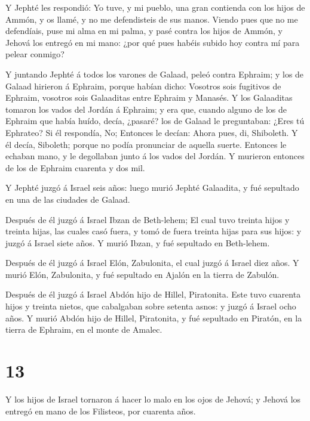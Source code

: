  Y Jephté les respondió: Yo tuve, y mi pueblo, una gran
contienda con los hijos de Ammón, y os llamé, y no me defendisteis de
sus manos.  Viendo pues que no me defendíais, puse mi alma
en mi palma, y pasé contra los hijos de Ammón, y Jehová los entregó en
mi mano: ¿por qué pues habéis subido hoy contra mí para pelear conmigo?

 Y juntando Jephté á todos los varones de Galaad, peleó
contra Ephraim; y los de Galaad hirieron á Ephraim, porque habían dicho:
Vosotros sois fugitivos de Ephraim, vosotros sois Galaaditas entre
Ephraim y Manasés.  Y los Galaaditas tomaron los vados del
Jordán á Ephraim; y era que, cuando alguno de los de Ephraim que había
huído, decía, ¿pasaré? los de Galaad le preguntaban: ¿Eres tú Ephrateo?
Si él respondía, No;  Entonces le decían: Ahora pues, di,
Shiboleth. Y él decía, Siboleth; porque no podía pronunciar de aquella
suerte. Entonces le echaban mano, y le degollaban junto á los vados del
Jordán. Y murieron entonces de los de Ephraim cuarenta y dos mil.

 Y Jephté juzgó á Israel seis años: luego murió Jephté
Galaadita, y fué sepultado en una de las ciudades de Galaad.

 Después de él juzgó á Israel Ibzan de Beth-lehem;
 El cual tuvo treinta hijos y treinta hijas, las cuales casó
fuera, y tomó de fuera treinta hijas para sus hijos: y juzgó á Israel
siete años.  Y murió Ibzan, y fué sepultado en Beth-lehem.

 Después de él juzgó á Israel Elón, Zabulonita, el cual
juzgó á Israel diez años.  Y murió Elón, Zabulonita, y fué
sepultado en Ajalón en la tierra de Zabulón.

 Después de él juzgó á Israel Abdón hijo de Hillel,
Piratonita.  Este tuvo cuarenta hijos y treinta nietos, que
cabalgaban sobre setenta asnos: y juzgó á Israel ocho años.
 Y murió Abdón hijo de Hillel, Piratonita, y fué sepultado
en Piratón, en la tierra de Ephraim, en el monte de Amalec.

\hypertarget{section-12}{%
\section{13}\label{section-12}}

 Y los hijos de Israel tornaron á hacer lo malo en los ojos
de Jehová; y Jehová los entregó en mano de los Filisteos, por cuarenta
años.

